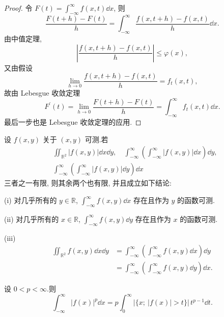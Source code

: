 \begin{proof}
令 $F(t) = \int_{-\infty}^{\infty} f(x,t)\dd x$, 则
\begin{equation*}
\frac{F(t+h) - F(t)}{h} = \int_{-\infty}^{\infty} \frac{f(x,t+h) - f(x,t)}{h}\dd x.
\end{equation*}
由中值定理, 
\begin{equation*}
\left| \frac{f(x,t+h) - f(x,t)}{h} \right| \leq \varphi(x),
\end{equation*}
又由假设
\begin{equation*}
\lim_{h \rightarrow 0} \frac{f(x,t+h) - f(x,t)}{h} = f_{t}(x,t),
\end{equation*}
故由 Lebesgue 收敛定理
\begin{equation*}
F^{\prime}(t) = \lim_{h \rightarrow 0} \frac{F(t+h) - F(t)}{h} = \int_{-\infty}^{\infty} f_{t}(x,t)\dd x.
\end{equation*}
最后一步也是 Lebesgue 收敛定理的应用.
\end{proof}

\begin{theorem}[Fubini 定理]\label{thm:1.1.5}
设 $f(x,y)$ 关于 $(x,y)$ 可测.若
\begin{align*}
&\iint_{\mathbb{R}^{2}} |f(x,y)|\dd x\dd y, \quad \int_{-\infty}^{\infty}\left(\int_{-\infty}^{\infty} |f(x,y)|\dd x\right)\dd y, \\
&\int_{-\infty}^{\infty}\left(\int_{-\infty}^{\infty} |f(x,y)|\dd y\right)\dd x
\end{align*}
三者之一有限, 则其余两个也有限, 并且成立如下结论:

(i) 对几乎所有的 $y \in \mathbb{R}$, $\int_{-\infty}^{\infty} f(x,y)\dd x$ 存在且作为 $y$ 的函数可测.

(ii) 对几乎所有的 $x \in \mathbb{R}$, $\int_{-\infty}^{\infty} f(x,y)\dd y$ 存在且作为 $x$ 的函数可测.

(iii)
\begin{align*}
\iint_{\mathbb{R}^{2}} f(x,y)\dd x\dd y
& = \int_{-\infty}^{\infty}\left(\int_{-\infty}^{\infty} f(x,y)\dd x\right)\dd y \\
& = \int_{-\infty}^{\infty}\left(\int_{-\infty}^{\infty} f(x,y)\dd y\right)\dd x.
\end{align*}
\end{theorem}

\begin{corollary}\label{cor:1.1.6}
设 $0 < p < \infty$.则
\begin{equation*}
\int_{-\infty}^{\infty} |f(x)|^{p}\dd x = p\int_{0}^{\infty} |\{x;\ |f(x)| > t\}|\,t^{p-1}\dd t.
\end{equation*}
\end{corollary}


